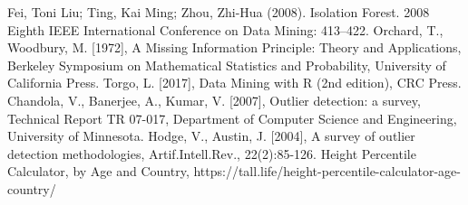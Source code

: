 \begin{thebibliography}{99}
 Fei, Toni Liu; Ting, Kai Ming; Zhou, Zhi-Hua (2008). Isolation Forest. 2008 Eighth IEEE International Conference on Data Mining: 413–422.
Orchard, T., Woodbury, M. [1972], A Missing Information Principle: Theory and Applications, Berkeley Symposium on Mathematical Statistics and Probability, University of California Press.  
Torgo, L. [2017], Data Mining with R (2nd edition), CRC Press.
Chandola, V., Banerjee, A., Kumar, V. [2007], Outlier detection: a survey, Technical Report TR 07-017, Department of Computer Science and Engineering, University of Minnesota.
Hodge, V., Austin, J. [2004], A survey of outlier detection methodologies, Artif.Intell.Rev., 22(2):85-126.
Height Percentile Calculator, by Age and Country, https://tall.life/height-percentile-calculator-age-country/ 
\end{thebibliography}








